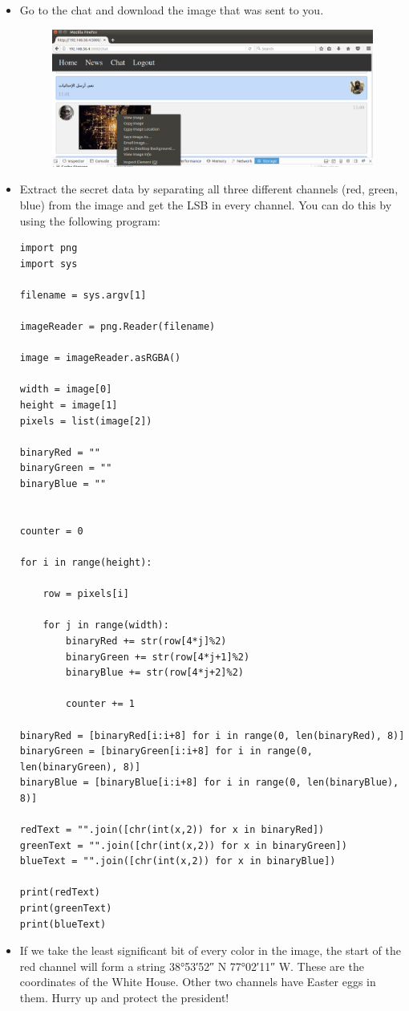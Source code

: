 \documentclass[11pt]{article}
\begin{document}
\begin{itemize}
\item Go to the chat and download the image that was sent to you.
\begin{figure}[H]
    \includegraphics[width=\linewidth]{images/steganography.png}
	\end{figure}
\item Extract the secret data by separating all three different channels (red, green, blue) from the image and get the LSB in every channel. You can do this by using the following program:

\begin{verbatim}
import png
import sys

filename = sys.argv[1]

imageReader = png.Reader(filename)

image = imageReader.asRGBA()

width = image[0]
height = image[1]
pixels = list(image[2])

binaryRed = ""
binaryGreen = ""
binaryBlue = ""


counter = 0

for i in range(height):

    row = pixels[i]

    for j in range(width):
        binaryRed += str(row[4*j]%2)
        binaryGreen += str(row[4*j+1]%2)
        binaryBlue += str(row[4*j+2]%2)

        counter += 1

binaryRed = [binaryRed[i:i+8] for i in range(0, len(binaryRed), 8)]
binaryGreen = [binaryGreen[i:i+8] for i in range(0, len(binaryGreen), 8)]
binaryBlue = [binaryBlue[i:i+8] for i in range(0, len(binaryBlue), 8)]

redText = "".join([chr(int(x,2)) for x in binaryRed])
greenText = "".join([chr(int(x,2)) for x in binaryGreen])
blueText = "".join([chr(int(x,2)) for x in binaryBlue])

print(redText)
print(greenText)
print(blueText)
\end{verbatim}
\item If we take the least significant bit of every color in the image, the start of the red channel will form a string \ang{38;53;52} N \ang{77;02;11} W. These are the coordinates of the White House. Other two channels have Easter eggs in them. Hurry up and protect the president!
\end{itemize}
\end{document}
